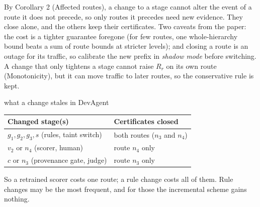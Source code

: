 By Corollary 2 (Affected routes), a change to a stage cannot alter the event of a route it does not precede, so only routes it precedes need new evidence. They close alone, and the others keep their certificates. Two caveats from the paper: the cost is a tighter guarantee foregone (for few routes, one whole-hierarchy bound beats a sum of route bounds at stricter levels); and closing a route is an outage for its traffic, so calibrate the new prefix in \emph{shadow mode} before switching. A change that only tightens a stage cannot raise $R_r$ on its own route (Monotonicity), but it can move traffic to later routes, so the conservative rule is kept.

\begin{example}{what a change stales in DevAgent}
\begin{center}
\renewcommand{\arraystretch}{1.25}
\begin{tabular}{@{}ll@{}}
\toprule
\textbf{Changed stage(s)} & \textbf{Certificates closed}\\
\midrule
$g_1,g_2,g_3,s$ (rules, taint switch) & both routes ($n_3$ and $n_4$)\\
$v_2$ or $n_4$ (scorer, human) & route $n_4$ only\\
$c$ or $n_3$ (provenance gate, judge) & route $n_3$ only\\
\bottomrule
\end{tabular}
\end{center}
So a retrained scorer costs one route; a rule change costs all of them. Rule changes may be the most frequent, and for those the incremental scheme gains nothing.
\end{example}


